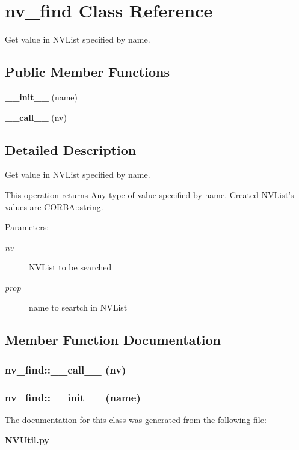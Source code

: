 \section{nv\_\-find Class Reference}
\label{classnv__find}
Get value in NVList specified by name.  


\subsection*{Public Member Functions}
\begin{CompactItemize}
\item 
{\bf \_\-\_\-init\_\-\_\-} (name)
\item 
{\bf \_\-\_\-call\_\-\_\-} (nv)
\end{CompactItemize}


\subsection{Detailed Description}
Get value in NVList specified by name. 

This operation returns Any type of value specified by name. Created NVList's values are CORBA::string.

\begin{Desc}
\item[Parameters:]
\begin{description}
\item[{\em nv}]NVList to be searched \item[{\em prop}]name to seartch in NVList\end{description}
\end{Desc}




\subsection{Member Function Documentation}
\subsubsection{\setlength{\rightskip}{0pt plus 5cm}nv\_\-find::\_\-\_\-call\_\-\_\- (nv)}\label{classnv__find_nv__finda1}


\subsubsection{\setlength{\rightskip}{0pt plus 5cm}nv\_\-find::\_\-\_\-init\_\-\_\- (name)}\label{classnv__find_nv__finda0}




The documentation for this class was generated from the following file:\begin{CompactItemize}
\item 
{\bf NVUtil.py}\end{CompactItemize}
